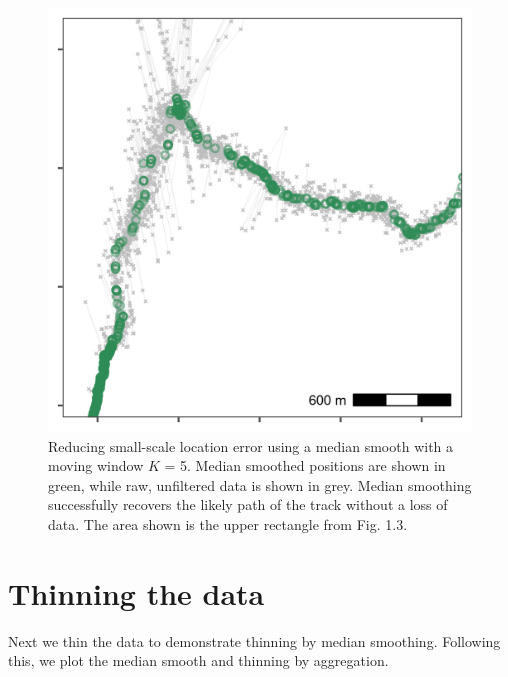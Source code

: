 \documentclass[]{scrreprt}
\begin{document}
\begin{figure}
\centering
\includegraphics{figures/fig_calib_median_smooth.png}
\caption{Reducing small-scale location error using a median smooth with a moving window \(K\) = 5. Median smoothed positions are shown in green, while raw, unfiltered data is shown in grey. Median smoothing successfully recovers the likely path of the track without a loss of data. The area shown is the upper rectangle from Fig. 1.3.}
\end{figure}

\hypertarget{thinning-the-data}{%
\section{Thinning the data}\label{thinning-the-data}}

Next we thin the data to demonstrate thinning by median smoothing.
Following this, we plot the median smooth and thinning by aggregation.
\end{document}
